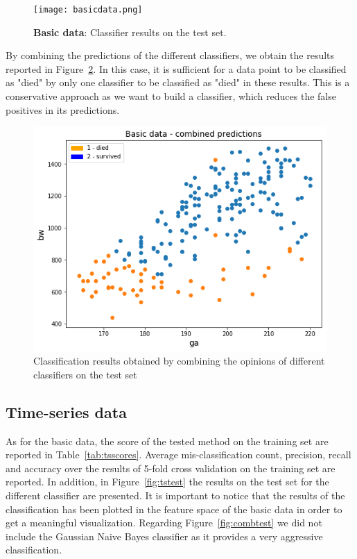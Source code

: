 \documentclass[a4paper,11pt]{article}
\begin{document}
\begin{figure}[H]
    \centering
    \texttt{[image: basicdata.png]}
    \caption{\textbf{Basic data}: Classifier results on the test set.}
    \label{fig:basicdatatest}
\end{figure}

By combining the predictions of the different classifiers, we obtain the results reported in Figure~\ref{fig:basicdatacomb}. In this case, it is sufficient for a data point to be classified as "died" by only one classifier to be classified as "died" in these results. This is a conservative approach as we want to build a classifier, which reduces the false positives in its predictions.

\begin{figure}[H]
    \centering
    \includegraphics[width=0.7\linewidth]{basic_data_combined.png}
    \caption{Classification results obtained by combining the opinions of different classifiers on the test set}
    \label{fig:basicdatacomb}
\end{figure}

\subsection{Time-series data}\label{sec:res_ts_data}
As for the basic data, the score of the tested method on the training set are reported in Table~\ref{tab:tsscores}. Average mis-classification count, precision, recall and accuracy over the results of 5-fold cross validation on the training set are reported. In addition, in Figure~\ref{fig:tstest} the results on the test set for the different classifier are presented. It is important to notice that the results of the classification has been plotted in the feature space of the basic data in order to get a meaningful visualization. Regarding Figure~\ref{fig:combtest} we did not include the Gaussian Naive Bayes classifier as it provides a very aggressive classification.
\end{document}

